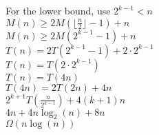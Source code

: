 \documentclass[14pt]{extarticle}
\begin{document}
For the lower bound, use $2^{k-1} < n$ \\
$M(n) \geq 2M\left(\lfloor \frac{n}{2} \rfloor - 1\right) + n$ \\
$M(n) \geq 2M(2^{k-1} - 1) + n$ \\
$T(n) = 2T(2^{k-1} - 1) + 2 \cdot 2^{k-1}$ \\
$T(n) = T(2 \cdot 2^{k-1})$ \\
$T(n) = T(4n)$ \\ 
$T(4n) = 2T(2n) + 4n$ \\
$2^{k+1}T\left(\frac{n}{2^{k-1}}\right) + 4(k+1)n$ \\
$4n + 4n \log_2(n) + 8n$ \\
$\Omega(n \log(n))$\\
\end{document}

